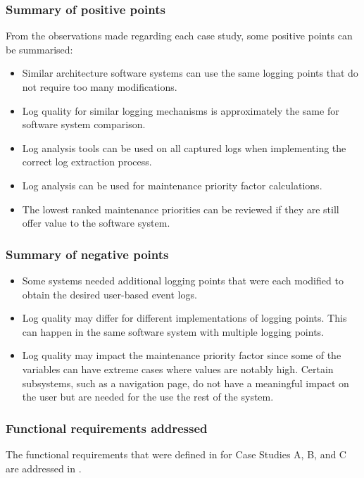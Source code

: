 \subsubsection{Summary of positive points}
From the observations made regarding each case study, some positive points can be summarised:

\begin{itemize}
	\item Similar architecture software systems can use the same logging points that do not require too many modifications.
	\item Log quality for similar logging mechanisms is approximately the same for software system comparison.
	\item Log analysis tools can be used on all captured logs when implementing the correct log extraction process.
	\item Log analysis can be used for maintenance priority factor calculations.
	\item The lowest ranked maintenance priorities can be reviewed if they are still offer value to the software system.
\end{itemize}

\subsubsection{Summary of negative points}

\begin{itemize}
	\item Some systems needed additional logging points that were each modified to obtain the desired user-based event logs.
	\item Log quality may differ for different implementations of logging points. This can happen in the same software system with multiple logging points.
	\item Log quality may impact the maintenance priority factor since some of the variables can have extreme cases where values are notably high. Certain subsystems, such as a navigation page, do not have a meaningful impact on the user but are needed for the use the rest of the system.
\end{itemize}

\clearpage

\subsubsection{Functional requirements addressed}
The functional requirements that were defined in  for Case Studies A, B, and C are addressed in .

